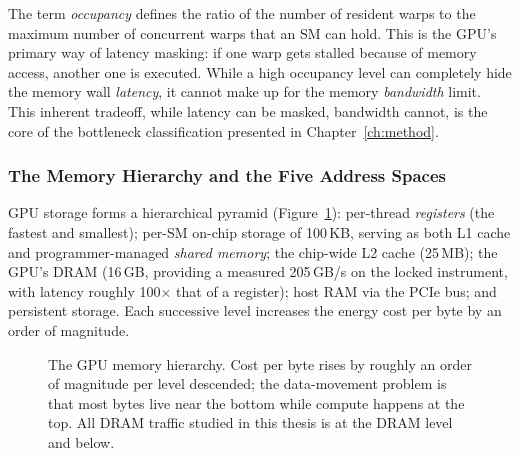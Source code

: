 The term \emph{occupancy} defines the ratio of the number of resident warps to the maximum number of concurrent warps that an SM can hold. This is the GPU's primary way of latency masking: if one warp gets stalled because of memory access, another one is executed. While a high occupancy level can completely hide the memory wall \emph{latency}, it cannot make up for the memory \emph{bandwidth} limit. This inherent tradeoff, while latency can be masked, bandwidth cannot, is the core of the bottleneck classification presented in Chapter~\ref{ch:method}.

\subsubsection{The Memory Hierarchy and the Five Address Spaces}\label{sec:bg-mem}

GPU storage forms a hierarchical pyramid (Figure~\ref{fig:memhier}): per-thread \emph{registers} (the fastest and smallest); per-SM on-chip storage of 100\,KB, serving as both L1 cache and programmer-managed \emph{shared memory}; the chip-wide L2 cache (25\,MB); the GPU's DRAM (16\,GB, providing a measured 205\,GB/s on the locked instrument, with latency roughly 100$\times$ that of a register); host RAM via the PCIe bus; and persistent storage. Each successive level increases the energy cost per byte by an order of magnitude.

\begin{figure}[t]
\centering
{}
\caption[The GPU memory hierarchy.]{The GPU memory hierarchy. Cost per byte rises
by roughly an order of magnitude per level descended; the data-movement problem is
that most bytes live near the bottom while compute happens at the top. All DRAM
traffic studied in this thesis is at the DRAM level and below.}
\label{fig:memhier}
\end{figure}

